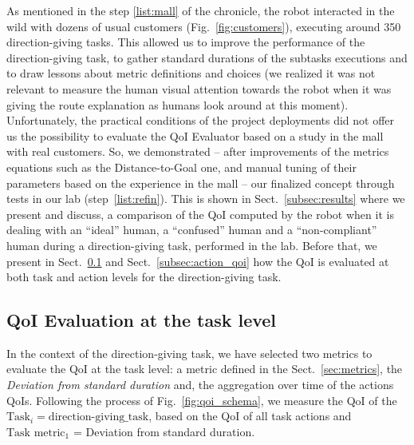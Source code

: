 \documentclass[a4paper,11pt,twoside]{StyleThese}
\begin{document}
As mentioned in the step \ref{list:mall} of the chronicle, the robot interacted in the wild with dozens of usual customers (Fig.~\ref{fig:customers}), executing around 350 direction-giving tasks. This allowed us to improve the performance of the direction-giving task, to gather standard durations of the subtasks executions and to draw lessons about metric definitions and choices (\eg we realized it was not relevant to measure the human visual attention towards the robot when it was giving the route explanation as humans look around at this moment). Unfortunately, the practical conditions of the project deployments did not offer us the possibility to evaluate the QoI Evaluator based on a study in the mall with real customers. So, we demonstrated -- after improvements of the metrics equations such as the Distance-to-Goal one, and manual tuning of their parameters based on the experience in the mall -- our finalized concept through tests in our lab (step~\ref{list:refin}). This is shown in Sect.~\ref{subsec:results} where we present and discuss, a comparison of the QoI computed by the robot when it is dealing with an ``ideal'' human, a ``confused'' human and a ``non-compliant'' human during a direction-giving task, performed in the lab. Before that, we present in Sect.~\ref{subsec:task_qoi} and Sect.~\ref{subsec:action_qoi} how the QoI is evaluated at both task and action levels for the direction-giving task.

\subsection{QoI Evaluation at the task level}\label{subsec:task_qoi}

In the context of the direction-giving task, we have selected two metrics to evaluate the QoI at the task level: a metric defined in the Sect.~\ref{sec:metrics}, the \emph{Deviation from standard duration} and, the aggregation over time of the actions QoIs. Following the process of Fig.~\ref{fig:qoi_schema}, we measure the QoI of the $\text{Task}_i = \text{direction-giving\_task}$, based on the QoI of all task actions and $\text{Task metric}_1$ = Deviation from standard duration.
\end{document}
